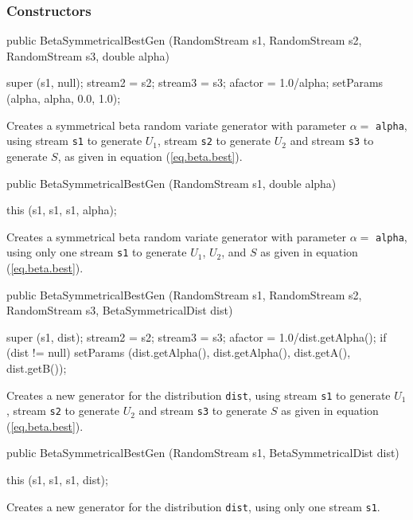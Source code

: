 \subsubsection* {Constructors}

\begin{code}

   public BetaSymmetricalBestGen (RandomStream s1, RandomStream s2,
                                  RandomStream s3, double alpha) \begin{hide} {
      super (s1, null);
      stream2 = s2;
      stream3 = s3;
      afactor = 1.0/alpha;
      setParams (alpha, alpha, 0.0, 1.0);
   }\end{hide}
\end{code}
  \begin{tabb} Creates a symmetrical beta random variate generator with
 parameter $\alpha =$ \texttt{alpha}, using stream \texttt{s1} to generate
  $U_1$, stream \texttt{s2} to generate $U_2$ and stream \texttt{s3} to
  generate $S$, as given in equation (\ref{eq.beta.best}).
  \end{tabb}
\begin{code}

   public BetaSymmetricalBestGen (RandomStream s1, double alpha) \begin{hide} {
     this (s1, s1, s1, alpha);
   }\end{hide}
\end{code}
  \begin{tabb}  Creates a symmetrical beta random variate generator with
 parameter $\alpha =$ \texttt{alpha},  using only one stream \texttt{s1}
  to generate $U_1$, $U_2$, and $S$ as given in equation (\ref{eq.beta.best}).
  \end{tabb}
\begin{code}

   public BetaSymmetricalBestGen (RandomStream s1, RandomStream s2,
                                  RandomStream s3, BetaSymmetricalDist dist) \begin{hide} {
      super (s1, dist);
      stream2 = s2;
      stream3 = s3;
      afactor = 1.0/dist.getAlpha();
      if (dist != null)
         setParams (dist.getAlpha(), dist.getAlpha(), dist.getA(), dist.getB());
   }\end{hide}
\end{code}
  \begin{tabb}  Creates a new generator for the distribution \texttt{dist},
 using stream \texttt{s1} to generate $U_1$, stream \texttt{s2} to generate $U_2$
 and stream \texttt{s3} to generate $S$ as given in equation (\ref{eq.beta.best}).
  \end{tabb}
\begin{code}

   public BetaSymmetricalBestGen (RandomStream s1, BetaSymmetricalDist dist) \begin{hide} {
     this (s1, s1, s1, dist);
   }\end{hide}
\end{code}
  \begin{tabb}  Creates a new generator for the distribution \texttt{dist},
     using only one stream \texttt{s1}.
  \end{tabb}

